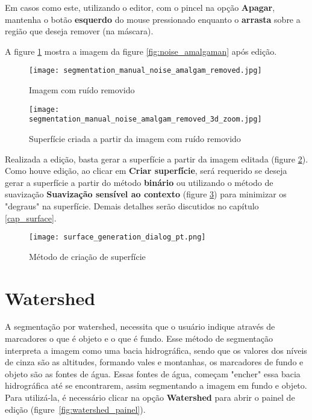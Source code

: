 Em casos como este, utilizando o editor, com o pincel na opção \textbf{Apagar}, mantenha o
botão \textbf{esquerdo} do mouse pressionado enquanto o \textbf{arrasta} sobre a região que
deseja remover (na máscara).

A figure \ref{fig:editor_amalgaman} mostra a imagem da figure \ref{fig:noise_amalgaman} após
edição.

\begin{figure}[!htb]
\centering
\texttt{[image: segmentation\_manual\_noise\_amalgam\_removed.jpg]}
\caption{Imagem com ruído removido}
\label{fig:editor_amalgaman}
\end{figure}

\begin{figure}[!htb]
\centering
\texttt{[image: segmentation\_manual\_noise\_amalgam\_removed\_3d\_zoom.jpg]}
\caption{Superfície criada a partir da imagem com ruído removido}
\label{fig:surface_edited_amalgaman}
\end{figure}

\newpage
Realizada a edição, basta gerar a superfície a partir da imagem editada (figure
\ref{fig:surface_edited_amalgaman}). Como houve edição, ao clicar em \textbf{Criar superfície}, será
requerido se deseja gerar a superfície a partir do método \textbf{binário} ou utilizando o método de suavização
\textbf{Suavização sensível ao contexto} (figure \ref{fig:new_surface_edited}) para minimizar os "degraus" na superfície.
Demais detalhes serão discutidos no capítulo \ref{cap_surface}.

\begin{figure}[!htb]
\centering
\texttt{[image: surface\_generation\_dialog\_pt.png]}
\caption{Método de criação de superfície}
\label{fig:new_surface_edited}
\end{figure}


\section{Watershed}

A segmentação por watershed, necessita que o usuário indique através de marcadores o que é objeto e o que é fundo. Esse método de segmentação interpreta a imagem como uma bacia hidrográfica, sendo que os valores dos níveis de cinza são as altitudes, formando vales e montanhas, os marcadores de fundo e objeto são as fontes de água. Essas fontes de água, começam "encher" essa bacia hidrográfica até se encontrarem, assim segmentando a imagem em fundo e objeto. Para utilizá-la, é necessário clicar na opção \textbf{Watershed} para abrir o painel de edição (figure~\ref{fig:watershed_painel}).


